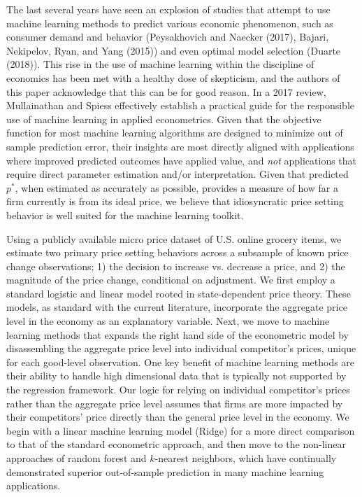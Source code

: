 \documentclass[11pt]{article}
\begin{document}
The last several years have seen an explosion of studies that attempt to use machine learning methods to predict various economic phenomenon, such as consumer demand and behavior (Peysakhovich and Naecker
(2017), Bajari, Nekipelov, Ryan, and Yang (2015)) and even optimal model selection (Duarte (2018)). This rise in the use of machine learning within the discipline of economics has been met with a healthy dose of skepticism, and the authors of this paper acknowledge that this can be for good reason. In a 2017 review, Mullainathan and Spiess effectively establish a practical guide for the responsible use of machine learning in applied econometrics. Given that the objective function for most machine learning algorithms are designed to minimize out of sample prediction error, their insights are most directly aligned with applications where improved predicted outcomes have applied value, and \textit{not} applications that require direct parameter estimation and/or interpretation. Given that predicted $p^*$, when estimated as accurately as possible, provides a measure of how far a firm currently is from its ideal price, we believe that idiosyncratic price setting behavior is well suited for the machine learning toolkit.   

Using a publicly available micro price dataset of U.S. online grocery items, we estimate two primary price setting behaviors across a subsample of known price change observations; 1) the decision to increase vs. decrease a price, and 2) the magnitude of the price change, conditional on adjustment. We first employ a standard logistic and linear model rooted in state-dependent price theory. These models, as standard with the current literature, incorporate the aggregate price level in the economy as an explanatory variable. Next, we move to machine learning methods that expands the right hand side of the econometric model by disassembling the aggregate price level into individual competitor's prices, unique for each good-level observation. One key benefit of machine learning methods are their ability to handle high dimensional data that is typically not supported by the regression framework. Our logic for relying on individual competitor's prices rather than the aggregate price level assumes that firms are more impacted by their competitors' price directly than the general price level in the economy. We begin with a linear machine learning model (Ridge) for a more direct comparison to that of the standard econometric approach, and then move to the non-linear approaches of random forest and $k$-nearest neighbors, which have continually demonstrated superior out-of-sample prediction in many machine learning applications. 
\end{document}
